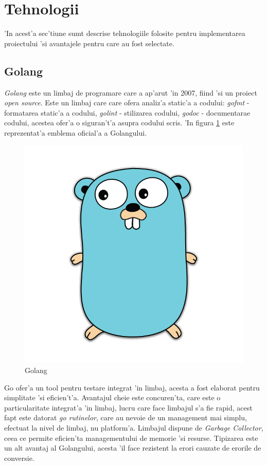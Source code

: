 \documentclass[12pt,a4paper,twoside]{report}
\begin{document}
\section{Tehnologii}
'In acest'a sec'tiune sumt descrise tehnologiile folosite pentru implementarea proiectului 'si avantajele pentru care au fost selectate.
\subsection{Golang}
\textit{Golang}  este un limbaj de programare care a ap'arut 'in 2007, fiind 'si un proiect \textit{open source}. Este un limbaj care care ofera analiz'a static'a a codului: \textit{gofmt} - formatarea static'a a codului, \textit{golint} - stilizarea codului, \textit{godoc} - documentarae codului, acestea ofer'a o siguran't'a asupra codului scris. 'In figura \ref{golang_pic} este reprezentat'a emblema oficial'a a Golangului.
\begin{figure}[H]
\begin{center}
\advance\leftskip-3cm
\advance\rightskip-3cm
\includegraphics[keepaspectratio=true,scale=0.15]{img/golang.png}
\caption{Golang}
\label{golang_pic}
\end{center}
\end{figure}
Go ofer'a un tool pentru testare integrat 'in limbaj, acesta a fost elaborat pentru simplitate 'si eficien't'a. Avantajul cheie este concuren'ta, care este o particularitate integrat'a 'in limbaj, lucru care face limbajul s'a fie rapid, acest fapt este datorat \textit{go rutinelor}, care au nevoie de un management mai simplu, efectuat la nivel de limbaj, nu platform'a. Limbajul dispune de \textit{Garbage Collector}, ceea ce permite eficien'ta managementului de memorie 'si resurse. Tipizarea este un alt avantaj al Golangului, acesta 'il face rezistent la erori cauzate de erorile de conversie.
\end{document}
